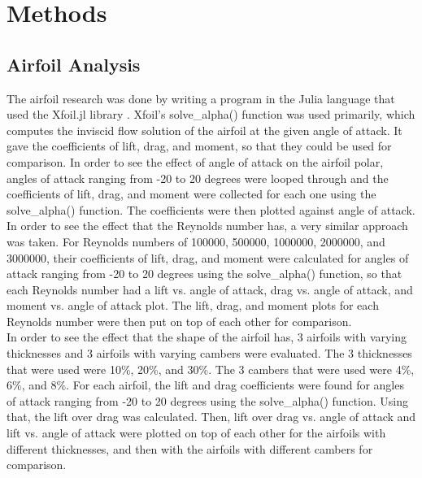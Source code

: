 \documentclass[journal]{new-aiaa}
\begin{document}
	
	
	\section{Methods}
	
	\subsection{Airfoil Analysis}
	The airfoil research was done by writing a program in the Julia language that used the Xfoil.jl library \cite{McDonnell}. Xfoil's solve\_alpha() function was used primarily, which computes the inviscid flow solution of the airfoil at the given angle of attack. It gave the coefficients of lift, drag, and moment, so that they could be used for comparison. In order to see the effect of angle of attack on the airfoil polar, angles of attack ranging from -20 to 20 degrees were looped through and the coefficients of lift, drag, and moment were collected for each one using the solve\_alpha() function. The coefficients were then plotted against angle of attack. \\
	
	In order to see the effect that the Reynolds number has, a very similar approach was taken. For Reynolds numbers of 100000, 500000, 1000000, 2000000, and 3000000, their coefficients of lift, drag, and moment were calculated for angles of attack ranging from -20 to 20 degrees using the solve\_alpha() function, so that each Reynolds number had a lift vs. angle of attack, drag vs. angle of attack, and moment vs. angle of attack plot. The lift, drag, and moment plots for each Reynolds number were then put on top of each other for comparison.\\
	
	In order to see the effect that the shape of the airfoil has, 3 airfoils with varying thicknesses and 3 airfoils with varying cambers were evaluated. The 3 thicknesses that were used were 10\%, 20\%, and 30\%. The 3 cambers that were used were 4\%, 6\%, and 8\%. For each airfoil, the lift and drag coefficients were found for angles of attack ranging from -20 to 20 degrees using the solve\_alpha() function. Using that, the lift over drag was calculated. Then, lift over drag vs. angle of attack and lift vs. angle of attack were plotted on top of each other for the airfoils with different thicknesses, and then with the airfoils with different cambers for comparison.\\
	
\end{document}

